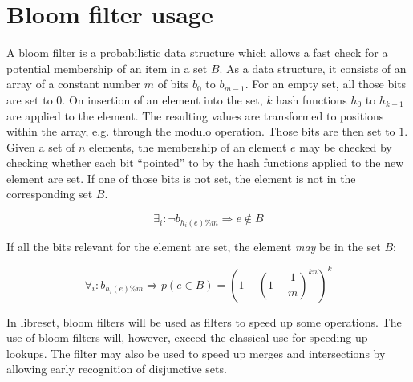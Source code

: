 \section{Bloom filter usage}
\label{sec:bloom_filter}

    A bloom filter is a probabilistic data structure which allows a fast check
    for a potential membership of an item in a set $B$.
    As a data structure, it consists of an array of a constant number $m$ of
    bits $b_0$ to $b_{m-1}$.
    For an empty set, all those bits are set to $0$.
    On insertion of an element into the set, $k$ hash functions $h_0$ to
    $h_{k-1}$ are applied to the element.
    The resulting values are transformed to positions within the array, e.g.
    through the modulo operation.
    Those bits are then set to $1$.
    Given a set of $n$ elements, the membership of an element $e$ may be checked
    by checking whether each bit ``pointed'' to by the hash functions applied to
    the new element are set.
    If one of those bits is not set, the element is not in the corresponding set
    $B$.

    \begin{equation}
        \exists_i : \neg b_{h_i(e)\%m} \Rightarrow e \notin B
    \end{equation}

    If all the bits relevant for the element are set, the element \emph{may} be
    in the set $B$:

    \begin{equation}
        \forall_i : b_{h_i(e)\%m} \Rightarrow
        p(e \in B) = \left(1 - \left(1 - \frac{1}{m} \right)^{kn} \right)^k
    \end{equation}

    In libreset, bloom filters will be used as filters to speed up some
    operations.
    The use of bloom filters will, however, exceed the classical use for
    speeding up lookups.
    The filter may also be used to speed up merges and intersections by allowing
    early recognition of disjunctive sets.


